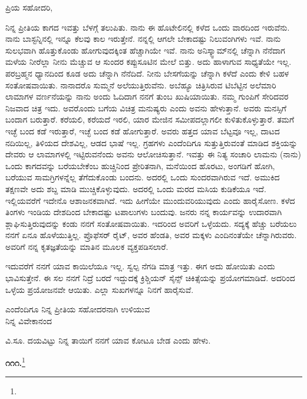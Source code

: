 \vspace{-0.5cm}

\noindent
ಪ್ರಿಯ ಸಹೋದರಿ,

ನಿನ್ನ ಪ್ರೀತಿಯ ಕಾಗದ ಇವತ್ತು ಬೆಳಗ್ಗೆ ತಲುಪಿತು. ನಾನು ಈ ಹೊಟೇಲಿನಲ್ಲಿ ಕಳೆದ ಒಂದು ವಾರದಿಂದ ಇರುವೆನು. ನಾನು ಬಾಸ್ಟನ್ನಿನಲ್ಲಿ ಇನ್ನೂ ಕೆಲವು ಕಾಲ ಇರುತ್ತೇನೆ. ನನ್ನಲ್ಲಿ ಆಗಲೇ ಬೇಕಾದಷ್ಟು ನಿಲುವಂಗಿಗಳು ಇವೆ. ನಾನು ಸುಲಭವಾಗಿ ಹೊತ್ತುಕೊಂಡು ಹೋಗುವುದಕ್ಕಿಂತ ಹೆಚ್ಚಾಗಿಯೇ ಇವೆ. ನಾನು ಅನಿಸ್ಕ್ವಾಮ್‌ನಲ್ಲಿ ಚೆನ್ನಾಗಿ ನೆನೆದಾಗ ಮಳೆಯ ನೀರೆಲ್ಲಾ ನೀನು ಮೆಚ್ಚುವ ಆ ಸುಂದರ ಕಪ್ಪುಸೂಟಿನ ಮೇಲೆ ಬಿತ್ತು. ಅದು ಹಾಳಾಗುವ ಸಾಧ್ಯತೆಯೇ ಇಲ್ಲ. ಪರಬ್ರಹ್ಮನ ಧ್ಯಾನದಿಂದ ಕೂಡ ಅದು ಚೆನ್ನಾಗಿ ನೆನೆದಿದೆ. ನೀನು ಬೇಸಗೆಯನ್ನು ಚೆನ್ನಾಗಿ ಕಳೆದೆ ಎಂದು ಕೇಳಿ ಬಹಳ ಸಂತೋಷವಾಯಿತು. ನಾನಾದರೊ ಸುಮ್ಮನೆ ಅಲೆಯುತ್ತಿರುವೆನು. ಅಬೆಹ್ಯೂ ಚಿತ್ರಿಸಿರುವ ಟಿಬೆಟ್ಟಿನ ಅಲೆಮಾರಿ ಲಾಮಾಗಳ ವರ್ಣನೆಯನ್ನು ನಾನು ಅಂದು ಓದಿದಾಗ ನನಗೆ ತುಂಬ ಖುಷಿಯಾಯಿತು. ನಮ್ಮ ಗುಂಪಿಗೆ ಸೇರಿದವರ ನಿಜವಾದ ಚಿತ್ರ ಇದು. ಅವರೊಂದು ಬಗೆಯ ವಿಚಿತ್ರ ಮನುಷ್ಯರು ಎಂದು ಅವನು ಹೇಳುತ್ತಾನೆ. ಅವರು ಮನಸ್ಸಿಗೆ ಬಂದಾಗ ಬರುತ್ತಾರೆ. ಕರೆಯಲಿ, ಕರೆಯದೆ ಇರಲಿ, ಯಾರ ಮೇಜಿನ ಸಮೀಪದಲ್ಲಾಗಲೀ ಕುಳಿತುಕೊಳ್ಳುತ್ತಾರೆ. ತಮಗೆ ಇಚ್ಛೆ ಬಂದ ಕಡೆ ಇರುತ್ತಾರೆ, ಇಚ್ಛೆ ಬಂದ ಕಡೆ ಹೋಗುತ್ತಾರೆ. ಅವರು ಹತ್ತದ ಯಾವ ಬೆಟ್ಟವೂ ಇಲ್ಲ, ದಾಟದ ನದಿಯಿಲ್ಲ, ತಿಳಿಯದ ದೇಶವಿಲ್ಲ, ಆಡದ ಭಾಷೆ ಇಲ್ಲ. ಗ್ರಹಗಳು ಎಂದೆಂದಿಗೂ ಸುತ್ತುತ್ತಿರುವಂತೆ ಮಾಡಿದ ಶಕ್ತಿಯನ್ನು ದೇವರು ಆ ಲಾಮಾಗಳಲ್ಲಿ ಇಟ್ಟಿರುವನೆಂದು ಅವನು ಆಲೋಚಿಸುತ್ತಾನೆ. ಇವತ್ತು ಈ ನಿತ್ಯ ಸಂಚಾರಿ ಲಾಮನು (ನಾನು) ಒಂದು ಕಾಗದವನ್ನು ಬರೆಯಬೇಕೆಂಬ ಹುಚ್ಚಿನಿಂದ ಪ್ರೇರಿತನಾಗಿ, ಮನೆಯಿಂದ ಹೊರಟು, ಅಂಗಡಿಗೆ ಹೋಗಿ, ಬರೆಯುವ ಸಾಮಗ್ರಿಗಳನ್ನೆಲ್ಲ ತೆಗೆದುಕೊಂಡು ಬಂದನು. ಅದರಲ್ಲಿ ಒಂದು ಸುಂದರವಾಗಿರುವ  ಇದೆ. ಅಮುಕಿದ ತಕ್ಷಣವೇ ಅದು ಶಬ್ದ ಮಾಡಿ ಮುಚ್ಚಿಕೊಳ್ಳುವುದು. ಅದರಲ್ಲಿ ಒಂದು ಮರದ ಮಸಿಯ ಕುಡಿಕೆಯೂ ಇದೆ. ಇಲ್ಲಿಯವರೆಗೆ ಇದೇನೊ ಆಶಾಜನಕವಾಗಿದೆ. ಇದು ಹೀಗೆಯೇ ಮುಂದುವರಿಯುವುದು ಎಂದು ಹಾರೈಸೋಣ. ಕಳೆದ ತಿಂಗಳು ಇಂಡಿಯ ದೇಶದಿಂದ ಬೇಕಾದಷ್ಟು ಟಪಾಲುಗಳು ಬಂದುವು. ಜನರು ನನ್ನ ಕಾರ್ಯವನ್ನು ಉದಾರವಾಗಿ ಶ್ಲಾಘಿಸುತ್ತಿರುವುದನ್ನು ಕಂಡು ನನಗೆ ಸಂತೋಷವಾಯಿತು. ಇದರಿಂದ ಅವರಿಗೆ ಒಳ್ಳೆಯದು. ಸದ್ಯಕ್ಕೆ ಹೆಚ್ಚು ಬರೆಯಲು ನನಗೆ ಏನೂ ಹೊಳೆಯುತ್ತಿಲ್ಲ. ಪ್ರೊಫೆಸರ್ ರೈಟ್, ಅವರ ಹೆಂಡತಿ, ಅವರ ಮಕ್ಕಳು ಎಂದಿನಂತೆಯೇ ಚೆನ್ನಾಗಿರುವರು. ಅವರಿಗೆ ನನ್ನ ಕೃತಜ್ಞತೆಯನ್ನು ಮಾತಿನ ಮೂಲಕ ವ್ಯಕ್ತಪಡಿಸಲಾರೆ.

ಇದುವರೆಗೆ ನನಗೆ ಯಾವ ಕಾಯಿಲೆಯೂ ಇಲ್ಲ. ಸ್ವಲ್ಪ ನೆಗಡಿ ಮಾತ್ರ ಇತ್ತು. ಈಗ ಅದು ಹೋಯಿತು ಎಂದು ಭಾವಿಸುತ್ತೇನೆ. ಈ ಸಲ ನನಗೆ ನಿದ್ರೆ ಬರದೆ ಇದ್ದುದಕ್ಕೆ ಕ್ರಿಶ್ಚಿಯನ್ ಸೈನ್ಸ್ ಚಿಕಿತ್ಸೆಯನ್ನು ಪ್ರಯೋಗಮಾಡಿದೆ. ಅದರಿಂದ ಒಳ್ಳೆಯ ಪ್ರಯೋಜನವೇ ಆಯಿತು. ಎಲ್ಲಾ ಸುಖಗಳನ್ನೂ ನಿನಗೆ ಹಾರೈಸುವೆ.

\begin{flushright}
ಎಂದೆಂದಿಗೂ ನಿನ್ನ ಪ್ರೀತಿಯ ಸಹೋದರನಾಗಿ ಉಳಿಯುವ\\ನಿನ್ನ ವಿವೇಕಾನಂದ
\end{flushright}

ವಿ.ಸೂ. ದಯವಿಟ್ಟು ನಿನ್ನ ತಾಯಿಗೆ ನನಗೆ ಯಾವ ಕೋಟೂ ಬೇಡ ಎಂದು ಹೇಳು.

\begin{center}
\textbf{೧೧೧.}\footnote{}
\end{center}

